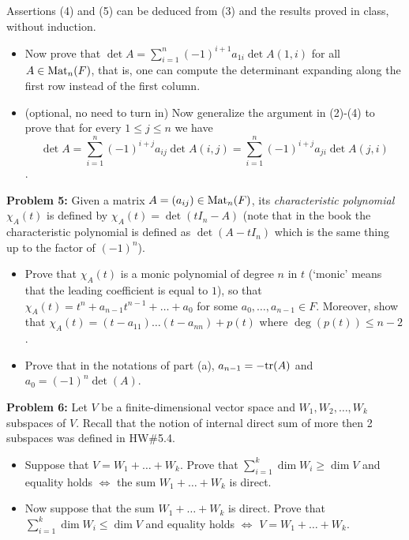 \documentclass[11pt]{amsart}
\begin{document}
Assertions (4) and (5) can be deduced from (3) and the results proved in class, without induction.
\begin{itemize}
\item[(4)] Now prove that $\det A=\sum\limits_{i=1}^n (-1)^{i+1}a_{1i}\det A(1,i)$ for all $A\in{\rm Mat}_n(F)$, that is, one can compute the determinant expanding along
the first row instead of the first column.
\item[(5)] (optional, no need to turn in) Now generalize the argument in (2)-(4) to prove that for every $1\leq j\leq n$ we have
$$\det A = \sum\limits_{i=1}^n (-1)^{i+j}a_{ij}\det A(i,j)=\sum\limits_{i=1}^n (-1)^{i+j}a_{ji}\det A(j,i)$$.
\end{itemize}
\skv 
{\bf Problem 5: } Given a matrix $A=(a_{ij})\in {\rm Mat}_{n}(F)$, its \emph{characteristic polynomial}
$\chi_A(t)$ is defined by $\chi_A(t)=\det(tI_n-A)$ (note that in the book the characteristic polynomial 
is defined as $\det(A-tI_n)$ which is the same thing up to the factor of $(-1)^n$).
\begin{itemize}
\item[(a)] Prove that $\chi_A(t)$ is a monic polynomial of degree $n$ in $t$ (`monic' means that
the leading coefficient is equal to $1$), so that $\chi_A(t)=t^n+a_{n-1}t^{n-1}+\ldots+a_0$ for some
$a_0,\ldots, a_{n-1}\in F$. Moreover, show that $\chi_A(t)=(t-a_{11})\ldots (t-a_{nn})+p(t)$
where $\deg (p(t))\leq n-2$.
\item[(b)] Prove that in the notations of part (a), $a_{n-1}=-{\rm tr}(A)$ and $a_0=(-1)^n \det(A)$. 
\end{itemize}
\skv

{\bf Problem 6:} Let $V$ be a finite-dimensional 
vector space and $W_1,W_2,\ldots, W_k$ subspaces of $V$. Recall that the notion of internal direct sum of 
more then 2 subspaces was defined in HW\#5.4. 
\begin{itemize}
\item[(a)] Suppose that $V=W_1+\ldots+W_k$. Prove that 
$\sum_{i=1}^k \dim W_i\geq \dim V$ and equality holds
$\iff$ the sum $W_1+\ldots+W_k$ is direct.
\item[(b)] Now suppose that the sum $W_1+\ldots+W_k$ is direct.
Prove that $\sum_{i=1}^k \dim W_i\leq \dim V$ and equality holds
$\iff$ $V=W_1+\ldots+W_k$.
\end{itemize}
\end{document}
